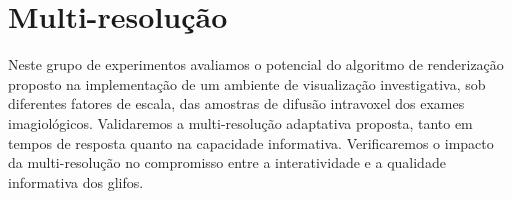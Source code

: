 


\section{Multi-resolução}
\label{sec::multi_resolução_e_performance_em_ambiente_de visualização_multimodal}

Neste grupo de experimentos avaliamos o potencial do algoritmo de renderização proposto na implementação de um ambiente de visualização investigativa, sob diferentes fatores de escala, das amostras de difusão intravoxel dos exames imagiológicos. Validaremos a  multi-resolução adaptativa proposta, tanto em tempos de resposta quanto na capacidade informativa. Verificaremos o impacto da multi-resolução no compromisso entre a interatividade e a qualidade informativa dos glifos.











